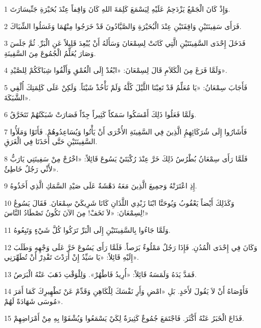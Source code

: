 \par 1 وَإِذْ كَانَ الْجَمْعُ يَزْدَحِمُ عَلَيْهِ لِيَسْمَعَ كَلِمَةَ اللهِ كَانَ وَاقِفاً عِنْدَ بُحَيْرَةِ جَنِّيسَارَتَ.
\par 2 فَرَأَى سَفِينَتَيْنِ وَاقِفَتَيْنِ عِنْدَ الْبُحَيْرَةِ وَالصَّيَّادُونَ قَدْ خَرَجُوا مِنْهُمَا وَغَسَلُوا الشِّبَاكَ.
\par 3 فَدَخَلَ إِحْدَى السَّفِينَتَيْنِ الَّتِي كَانَتْ لِسِمْعَانَ وَسَأَلَهُ أَنْ يُبْعِدَ قَلِيلاً عَنِ الْبَرِّ. ثُمَّ جَلَسَ وَصَارَ يُعَلِّمُ الْجُمُوعَ مِنَ السَّفِينَةِ.
\par 4 وَلَمَّا فَرَغَ مِنَ الْكَلاَمِ قَالَ لِسِمْعَانَ: «ابْعُدْ إِلَى الْعُمْقِ وَأَلْقُوا شِبَاكَكُمْ لِلصَّيْدِ».
\par 5 فَأَجَابَ سِمْعَانُ: «يَا مُعَلِّمُ قَدْ تَعِبْنَا اللَّيْلَ كُلَّهُ وَلَمْ نَأْخُذْ شَيْئاً. وَلَكِنْ عَلَى كَلِمَتِكَ أُلْقِي الشَّبَكَةَ».
\par 6 وَلَمَّا فَعَلُوا ذَلِكَ أَمْسَكُوا سَمَكاً كَثِيراً جِدّاً فَصَارَتْ شَبَكَتُهُمْ تَتَخَرَّقُ.
\par 7 فَأَشَارُوا إِلَى شُرَكَائِهِمُِ الَّذِينَ فِي السَّفِينَةِ الأُخْرَى أَنْ يَأْتُوا وَيُسَاعِدُوهُمْ. فَأَتَوْا وَمَلَأُوا السَّفِينَتَيْنِ حَتَّى أَخَذَتَا فِي الْغَرَقِ.
\par 8 فَلَمَّا رَأَى سِمْعَانُ بُطْرُسُ ذَلِكَ خَرَّ عِنْدَ رُكْبَتَيْ يَسُوعَ قَائِلاً: «اخْرُجْ مِنْ سَفِينَتِي يَارَبُّ لأَنِّي رَجُلٌ خَاطِئٌ».
\par 9 إِذِ اعْتَرَتْهُ وَجمِيعَ الَّذِينَ مَعَهُ دَهْشَةٌ عَلَى صَيْدِ السَّمَكِ الَّذِي أَخَذُوهُ.
\par 10 وَكَذَلِكَ أَيْضاً يَعْقُوبُ وَيُوحَنَّا ابْنَا زَبْدِي اللَّذَانِ كَانَا شَرِيكَيْ سِمْعَانَ. فَقَالَ يَسُوعُ لِسِمْعَانَ: «لاَ تَخَفْ! مِنَ الآنَ تَكُونُ تَصْطَادُ النَّاسَ!»
\par 11 وَلَمَّا جَاءُوا بِالسَّفِينَتَيْنِ إِلَى الْبَرِّ تَرَكُوا كُلَّ شَيْءٍ وَتَبِعُوهُ.
\par 12 وَكَانَ فِي إِحْدَى الْمُدُنِ. فَإِذَا رَجُلٌ مَمْلُوءٌ بَرَصاً. فَلَمَّا رَأَى يَسُوعَ خَرَّ عَلَى وَجْهِهِ وَطَلَبَ إِلَيْهِ قَائِلاً: «يَا سَيِّدُ إِنْ أَرَدْتَ تَقْدِرْ أَنْ تُطَهِّرَنِي».
\par 13 فَمَدَّ يَدَهُ وَلَمَسَهُ قَائِلاً: «أُرِيدُ فَاطْهُرْ». وَلِلْوَقْتِ ذَهَبَ عَنْهُ الْبَرَصُ.
\par 14 فَأَوْصَاهُ أَنْ لاَ يَقُولَ لأَحَدٍ. بَلِ «امْضِ وَأَرِ نَفْسَكَ لِلْكَاهِنِ وَقَدِّمْ عَنْ تَطْهِيرِكَ كَمَا أَمَرَ مُوسَى شَهَادَةً لَهُمْ».
\par 15 فَذَاعَ الْخَبَرُ عَنْهُ أَكْثَرَ. فَاجْتَمَعَ جُمُوعٌ كَثِيرَةٌ لِكَيْ يَسْمَعُوا وَيُشْفَوْا بِهِ مِنْ أَمْرَاضِهِمْ.
